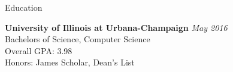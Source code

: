 \documentclass{resume} %
\begin{document}

\begin{rSection}{Education}

{\bf University of Illinois at Urbana-Champaign} \hfill {\em May 2016} \\ 
Bachelors of Science, Computer Science \\
Overall GPA: 3.98 \\
Honors: James Scholar, Dean's List
\end{rSection}

\end{document}
